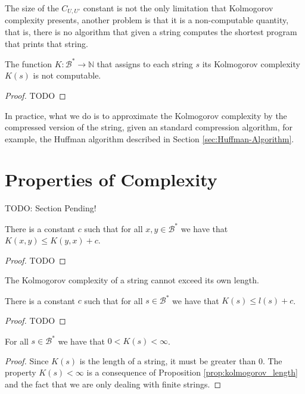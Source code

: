 The size of the $C_{U, U'}$ constant is not the only limitation that Kolmogorov complexity presents, another problem is that it is a non-computable quantity, that is, there is no algorithm that given a string computes the shortest program that prints that string.

\begin{theorem}
The function $K:\mathcal{B}^\ast \rightarrow \mathbb{N}$ that assigns to each string $s$ its Kolmogorov complexity $K(s)$ is not computable.
\end{theorem}
\begin{proof}
{\color{red} TODO}
\end{proof}

In practice, what we do is to approximate the Kolmogorov complexity by the compressed version of the string, given an standard compression algorithm, for example, the Huffman algorithm described in Section \ref{sec:Huffman-Algorithm}.

%
%

\section{Properties of Complexity}

{\color{red} TODO: Section Pending!}

\begin{proposition}
\label{prop:kolmogorov_order}
There is a constant $c$ such that for all $x, y \in\mathcal{B}^{\ast}$ we have that $K(x, y) \leq K(y, x) + c$.
\end{proposition}
\begin{proof}
{\color{red} TODO}
\end{proof}


The Kolmogorov complexity of a string cannot exceed its own length.

\begin{proposition}
\label{prop:kolmogorov_length}
There is a constant $c$ such that for all $s\in\mathcal{B}^{\ast}$ we have that $K(s) \leq l(s)+c$.
\end{proposition}
\begin{proof}
{\color{red} TODO}
\end{proof}

\begin{proposition}
For all $s\in\mathcal{B}^{\ast}$ we have that $0 < K(s) < \infty$.
\end{proposition}
\begin{proof}
Since $K(s)$ is the length of a string, it must be greater than $0$. The property $K(s) < \infty$ is a consequence of Proposition \ref{prop:kolmogorov_length} and the fact that we are only dealing with finite strings.
\end{proof}


